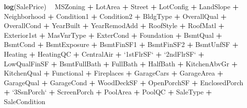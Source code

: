 \documentclass[american,]{article}
\newenvironment{Shaded}{\begin{snugshade}}{\end{snugshade}}
\newcommand{\DataTypeTok}[1]{\textcolor[rgb]{0.13,0.29,0.53}{#1}}
\newcommand{\KeywordTok}[1]{\textcolor[rgb]{0.13,0.29,0.53}{\textbf{#1}}}
\newcommand{\NormalTok}[1]{#1}
\newcommand{\OperatorTok}[1]{\textcolor[rgb]{0.81,0.36,0.00}{\textbf{#1}}}
\newcommand{\StringTok}[1]{\textcolor[rgb]{0.31,0.60,0.02}{#1}}
\begin{document}
\begin{Shaded}
\begin{Highlighting}[]
\KeywordTok{log}\NormalTok{(SalePrice) }\OperatorTok{~}\StringTok{ }
\StringTok{           }\NormalTok{MSZoning }\OperatorTok{+}\StringTok{ }\NormalTok{LotArea }\OperatorTok{+}\StringTok{ }\NormalTok{Street }\OperatorTok{+}\StringTok{ }\NormalTok{LotConfig }\OperatorTok{+}\StringTok{ }\NormalTok{LandSlope }\OperatorTok{+}
\StringTok{           }\NormalTok{Neighborhood }\OperatorTok{+}\StringTok{ }\NormalTok{Condition1 }\OperatorTok{+}\StringTok{ }\NormalTok{Condition2 }\OperatorTok{+}\StringTok{ }\NormalTok{BldgType }\OperatorTok{+}\StringTok{ }\NormalTok{OverallQual }\OperatorTok{+}
\StringTok{           }\NormalTok{OverallCond }\OperatorTok{+}\StringTok{ }\NormalTok{YearBuilt }\OperatorTok{+}\StringTok{ }\NormalTok{YearRemodAdd }\OperatorTok{+}\StringTok{ }\NormalTok{RoofStyle }\OperatorTok{+}\StringTok{ }\NormalTok{RoofMatl }\OperatorTok{+}
\StringTok{           }\NormalTok{Exterior1st }\OperatorTok{+}\StringTok{ }\NormalTok{MasVnrType }\OperatorTok{+}\StringTok{ }\NormalTok{ExterCond }\OperatorTok{+}\StringTok{ }\NormalTok{Foundation }\OperatorTok{+}\StringTok{ }\NormalTok{BsmtQual }\OperatorTok{+}
\StringTok{           }\NormalTok{BsmtCond }\OperatorTok{+}\StringTok{ }\NormalTok{BsmtExposure }\OperatorTok{+}\StringTok{ }\NormalTok{BsmtFinSF1 }\OperatorTok{+}\StringTok{ }\NormalTok{BsmtFinSF2 }\OperatorTok{+}\StringTok{ }\NormalTok{BsmtUnfSF }\OperatorTok{+}
\StringTok{           }\NormalTok{Heating }\OperatorTok{+}\StringTok{ }\NormalTok{HeatingQC }\OperatorTok{+}\StringTok{ }\NormalTok{CentralAir }\OperatorTok{+}\StringTok{ `}\DataTypeTok{1stFlrSF}\StringTok{`} \OperatorTok{+}\StringTok{ `}\DataTypeTok{2ndFlrSF}\StringTok{`} \OperatorTok{+}
\StringTok{           }\NormalTok{LowQualFinSF }\OperatorTok{+}\StringTok{ }\NormalTok{BsmtFullBath }\OperatorTok{+}\StringTok{ }\NormalTok{FullBath }\OperatorTok{+}\StringTok{ }\NormalTok{HalfBath }\OperatorTok{+}\StringTok{ }\NormalTok{KitchenAbvGr }\OperatorTok{+}
\StringTok{           }\NormalTok{KitchenQual }\OperatorTok{+}\StringTok{ }\NormalTok{Functional }\OperatorTok{+}\StringTok{ }\NormalTok{Fireplaces }\OperatorTok{+}\StringTok{ }\NormalTok{GarageCars }\OperatorTok{+}\StringTok{ }\NormalTok{GarageArea }\OperatorTok{+}
\StringTok{           }\NormalTok{GarageQual }\OperatorTok{+}\StringTok{ }\NormalTok{GarageCond }\OperatorTok{+}\StringTok{ }\NormalTok{WoodDeckSF }\OperatorTok{+}\StringTok{ }\NormalTok{OpenPorchSF }\OperatorTok{+}\StringTok{ }\NormalTok{EnclosedPorch }\OperatorTok{+}
\StringTok{           `}\DataTypeTok{3SsnPorch}\StringTok{`} \OperatorTok{+}\StringTok{ }\NormalTok{ScreenPorch }\OperatorTok{+}\StringTok{ }\NormalTok{PoolArea }\OperatorTok{+}\StringTok{ }\NormalTok{PoolQC }\OperatorTok{+}\StringTok{ }\NormalTok{SaleType }\OperatorTok{+}
\StringTok{           }\NormalTok{SaleCondition}
\end{Highlighting}
\end{Shaded}
\end{document}
